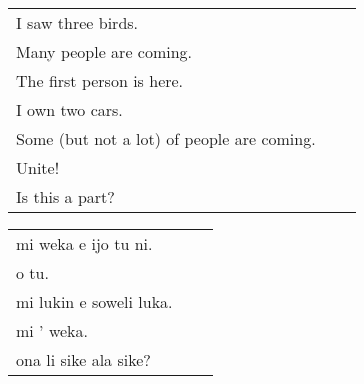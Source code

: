 \begin{supertabular}{p{5,5cm}|ll}
    I saw three birds.                         &  & \\
    Many people are coming.                    &  & \\
    The first person is here.                  &  & \\
    I own two cars.                            &  & \\
    Some (but not a lot) of people are coming. &  & \\
    Unite!                                     &  & \\
    Is this a part?                            &  & \\
\end{supertabular}

\begin{supertabular}{p{5,5cm}|ll}
    mi weka e ijo tu ni.    &  & \\
    o tu.                   &  & \\
    mi lukin e soweli luka. &  & \\
    mi ' weka.              &  & \\
    ona li sike ala sike?   &  & \\
\end{supertabular}
